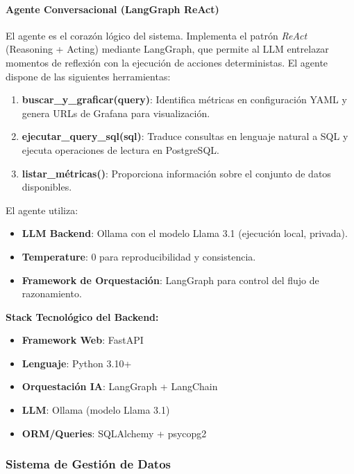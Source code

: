 \documentclass[11pt, a4paper]{report}
\begin{document}
\paragraph{Agente Conversacional (LangGraph ReAct)}

El agente es el corazón lógico del sistema. Implementa el patrón \textit{ReAct} (Reasoning + Acting) mediante LangGraph, que permite al LLM entrelazar momentos de reflexión con la ejecución de acciones deterministas. El agente dispone de las siguientes herramientas:

\begin{enumerate}
    \item \textbf{buscar\_y\_graficar(query)}: Identifica métricas en configuración YAML y genera URLs de Grafana para visualización.
    \item \textbf{ejecutar\_query\_sql(sql)}: Traduce consultas en lenguaje natural a SQL y ejecuta operaciones de lectura en PostgreSQL.
    \item \textbf{listar\_métricas()}: Proporciona información sobre el conjunto de datos disponibles.
\end{enumerate}

El agente utiliza:
\begin{itemize}
    \item \textbf{LLM Backend}: Ollama con el modelo Llama 3.1 (ejecución local, privada).
    \item \textbf{Temperature}: 0 para reproducibilidad y consistencia.
    \item \textbf{Framework de Orquestación}: LangGraph para control del flujo de razonamiento.
\end{itemize}

\textbf{Stack Tecnológico del Backend:}
\begin{itemize}
    \item \textbf{Framework Web}: FastAPI
    \item \textbf{Lenguaje}: Python 3.10+
    \item \textbf{Orquestación IA}: LangGraph + LangChain
    \item \textbf{LLM}: Ollama (modelo Llama 3.1)
    \item \textbf{ORM/Queries}: SQLAlchemy + psycopg2
\end{itemize}

\subsubsection{Sistema de Gestión de Datos}
\end{document}
